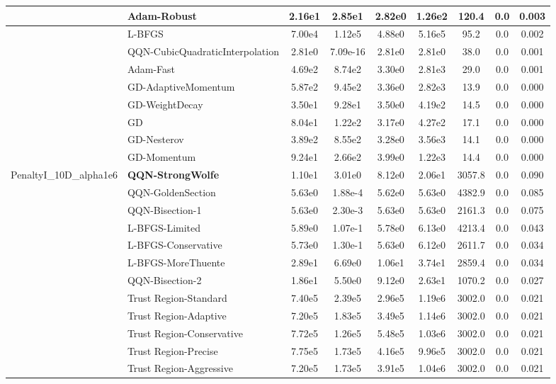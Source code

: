 \documentclass{article}
\begin{document}
\begin{longtable}{|l|l|c|c|c|c|c|c|c|}
\hline
 & Adam-Robust & 2.16e1 & 2.85e1 & 2.82e0 & 1.26e2 & 120.4 & 0.0 & 0.003 \\
\hline
 & L-BFGS & 7.00e4 & 1.12e5 & 4.88e0 & 5.16e5 & 95.2 & 0.0 & 0.002 \\
\hline
 & QQN-CubicQuadraticInterpolation & 2.81e0 & 7.09e-16 & 2.81e0 & 2.81e0 & 38.0 & 0.0 & 0.001 \\
\hline
 & Adam-Fast & 4.69e2 & 8.74e2 & 3.30e0 & 2.81e3 & 29.0 & 0.0 & 0.001 \\
\hline
 & GD-AdaptiveMomentum & 5.87e2 & 9.45e2 & 3.36e0 & 2.82e3 & 13.9 & 0.0 & 0.000 \\
\hline
 & GD-WeightDecay & 3.50e1 & 9.28e1 & 3.50e0 & 4.19e2 & 14.5 & 0.0 & 0.000 \\
\hline
 & GD & 8.04e1 & 1.22e2 & 3.17e0 & 4.27e2 & 17.1 & 0.0 & 0.000 \\
\hline
 & GD-Nesterov & 3.89e2 & 8.55e2 & 3.28e0 & 3.56e3 & 14.1 & 0.0 & 0.000 \\
\hline
 & GD-Momentum & 9.24e1 & 2.66e2 & 3.99e0 & 1.22e3 & 14.4 & 0.0 & 0.000 \\
PenaltyI\_10D\_alpha1e6 & \textbf{QQN-StrongWolfe} & 1.10e1 & 3.01e0 & 8.12e0 & 2.06e1 & 3057.8 & 0.0 & 0.090 \\
\hline
 & QQN-GoldenSection & 5.63e0 & 1.88e-4 & 5.62e0 & 5.63e0 & 4382.9 & 0.0 & 0.085 \\
\hline
 & QQN-Bisection-1 & 5.63e0 & 2.30e-3 & 5.63e0 & 5.63e0 & 2161.3 & 0.0 & 0.075 \\
\hline
 & L-BFGS-Limited & 5.89e0 & 1.07e-1 & 5.78e0 & 6.13e0 & 4213.4 & 0.0 & 0.043 \\
\hline
 & L-BFGS-Conservative & 5.73e0 & 1.30e-1 & 5.63e0 & 6.12e0 & 2611.7 & 0.0 & 0.034 \\
\hline
 & L-BFGS-MoreThuente & 2.89e1 & 6.69e0 & 1.06e1 & 3.74e1 & 2859.4 & 0.0 & 0.034 \\
\hline
 & QQN-Bisection-2 & 1.86e1 & 5.50e0 & 9.12e0 & 2.63e1 & 1070.2 & 0.0 & 0.027 \\
\hline
 & Trust Region-Standard & 7.40e5 & 2.39e5 & 2.96e5 & 1.19e6 & 3002.0 & 0.0 & 0.021 \\
\hline
 & Trust Region-Adaptive & 7.20e5 & 1.83e5 & 3.49e5 & 1.14e6 & 3002.0 & 0.0 & 0.021 \\
\hline
 & Trust Region-Conservative & 7.72e5 & 1.26e5 & 5.48e5 & 1.03e6 & 3002.0 & 0.0 & 0.021 \\
\hline
 & Trust Region-Precise & 7.75e5 & 1.73e5 & 4.16e5 & 9.96e5 & 3002.0 & 0.0 & 0.021 \\
\hline
 & Trust Region-Aggressive & 7.20e5 & 1.73e5 & 3.91e5 & 1.04e6 & 3002.0 & 0.0 & 0.021 \\

\end{longtable}
\end{document}
